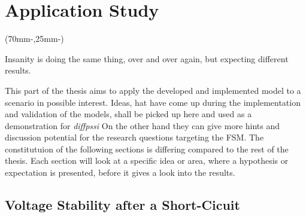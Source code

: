


\chapter{Application Study}
\label{chap:case-study}

\begin{textblock*}{.7\textwidth}(70mm-\offset,25mm-\offset)
    \begin{fquote}
        Insanity is doing the same thing, over and over again, but expecting different results.
    \end{fquote}
\end{textblock*}

This part of the thesis aims to apply the developed and implemented model to a scenario in possible interest.
Ideas, hat have come up during the implementation and validation of the models, shall be picked up here and used as a demonstration for \textit{diffpssi}
On the other hand they can give more hints and discussion potential for the research questions targeting the \acs{FSM}.
The constitutuion of the following sections is differing compared to the rest of the thesis.
Each section will look at a specific idea or area, where a hypothesis or expectation is presented, before it gives a look into the results.

\section{Voltage Stability after a Short-Cicuit}
\label{sec:case-1}

